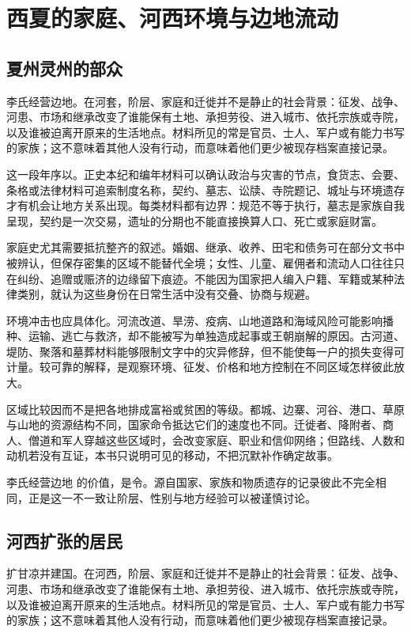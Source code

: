 \section{西夏的家庭、河西环境与边地流动}

\subsection{夏州灵州的部众}

李氏经营边地。在河套，阶层、家庭和迁徙并不是静止的社会背景：征发、战争、河患、市场和继承改变了谁能保有土地、承担劳役、进入城市、依托宗族或寺院，以及谁被迫离开原来的生活地点。材料所见的常是官员、士人、军户或有能力书写的家族；这不意味着其他人没有行动，而意味着他们更少被现存档案直接记录。

这一段年序以。正史本纪和编年材料可以确认政治与灾害的节点，食货志、会要、条格或法律材料可追索制度名称，契约、墓志、讼牍、寺院题记、城址与环境遗存才有机会让地方关系出现。每类材料都有边界：规范不等于执行，墓志是家族自我呈现，契约是一次交易，遗址的分期也不能直接换算人口、死亡或家庭财富。

家庭史尤其需要抵抗整齐的叙述。婚姻、继承、收养、田宅和债务可在部分文书中被辨认，但保存密集的区域不能替代全境；女性、儿童、雇佣者和流动人口往往只在纠纷、追赠或赈济的边缘留下痕迹。不能因为国家把人编入户籍、军籍或某种法律类别，就认为这些身份在日常生活中没有交叠、协商与规避。

环境冲击也应具体化。河流改道、旱涝、疫病、山地道路和海域风险可能影响播种、运输、逃亡与救济，却不能被写为单独造成起事或王朝崩解的原因。古河道、堤防、聚落和墓葬材料能够限制文字中的灾异修辞，但不能使每一户的损失变得可计量。较可靠的解释，是观察环境、征发、价格和地方控制在不同区域怎样彼此放大。

区域比较因而不是把各地排成富裕或贫困的等级。都城、边寨、河谷、港口、草原与山地的资源结构不同，国家命令抵达它们的速度也不同。迁徙者、降附者、商人、僧道和军人穿越这些区域时，会改变家庭、职业和信仰网络；但路线、人数和动机若没有互证，本书只说明可见的移动，不把沉默补作确定故事。

李氏经营边地 的价值，是令。源自国家、家族和物质遗存的记录彼此不完全相同，正是这一不一致让阶层、性别与地方经验可以被谨慎讨论。

\subsection{河西扩张的居民}

扩甘凉并建国。在河西，阶层、家庭和迁徙并不是静止的社会背景：征发、战争、河患、市场和继承改变了谁能保有土地、承担劳役、进入城市、依托宗族或寺院，以及谁被迫离开原来的生活地点。材料所见的常是官员、士人、军户或有能力书写的家族；这不意味着其他人没有行动，而意味着他们更少被现存档案直接记录。

